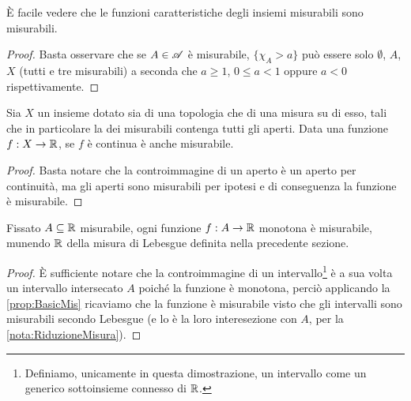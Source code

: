 \begin{remark}\label{nota:CarMis}
	È facile vedere che le funzioni caratteristiche degli insiemi misurabili sono misurabili.
\end{remark}
\begin{proof}
	Basta osservare che se $A\in \mathscr A$ è misurabile, $\{ \chi_A > a\}$ può essere solo $\emptyset$, $A$, $X$ (tutti e tre misurabili) a seconda che
	$a\ge 1$, $0\le a< 1$ oppure $a < 0$ rispettivamente.
\end{proof}

\begin{remark}\label{nota:ContinueMisurabili}
	Sia $X$ un insieme dotato sia di una topologia che di una misura su di esso, tali che in particolare la \sigalg{} dei misurabili contenga tutti gli aperti.
	Data una funzione $f:X\to\mathbb R$, se $f$ è continua è anche misurabile.
\end{remark}
\begin{proof}
	Basta notare che la controimmagine di un aperto è un aperto per continuità, ma gli aperti sono misurabili per ipotesi e di conseguenza la funzione è misurabile.
\end{proof}

\begin{remark}\label{nota:MonotoneMisurabili}
	Fissato $A\subseteq \mathbb R$ misurabile, ogni funzione $f:A\to\mathbb R$ monotona è misurabile, munendo $\mathbb R$ della misura di Lebesgue definita nella precedente sezione.
\end{remark}
\begin{proof}
	È sufficiente notare che la controimmagine di un intervallo\footnote{Definiamo, unicamente in questa dimostrazione, un intervallo come un generico sottoinsieme connesso di $\mathbb R$.} è a sua volta un intervallo intersecato $A$ poiché la funzione è monotona, perciò applicando la \cref{prop:BasicMis} ricaviamo che la funzione è misurabile visto che gli intervalli sono misurabili secondo Lebesgue (e lo è la loro interesezione con $A$, per la \cref{nota:RiduzioneMisura}).
\end{proof}

